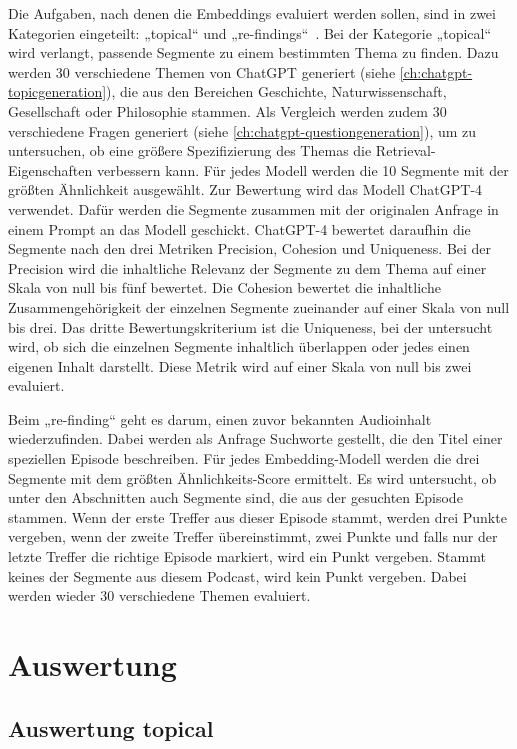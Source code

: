 Die Aufgaben, nach denen die Embeddings evaluiert werden sollen, sind in zwei Kategorien eingeteilt: „topical“ und „re-findings“~\cite{jones2021}. 
Bei der Kategorie „topical“ wird verlangt, passende Segmente zu einem bestimmten Thema zu finden. Dazu werden 30 verschiedene Themen von ChatGPT generiert (siehe \autoref{ch:chatgpt-topicgeneration}), die aus den Bereichen Geschichte, Naturwissenschaft, Gesellschaft oder Philosophie stammen. Als Vergleich werden zudem 30 verschiedene Fragen generiert (siehe \autoref{ch:chatgpt-questiongeneration}), um zu untersuchen, ob eine größere Spezifizierung des Themas die Retrieval-Eigenschaften verbessern kann. 
Für jedes Modell werden die 10 Segmente mit der größten Ähnlichkeit ausgewählt. 
Zur Bewertung wird das Modell ChatGPT-4 verwendet. Dafür werden die Segmente zusammen mit der originalen Anfrage in einem Prompt an das Modell geschickt. 
ChatGPT-4 bewertet daraufhin die Segmente nach den drei Metriken Precision, Cohesion und Uniqueness.
Bei der Precision wird die inhaltliche Relevanz der Segmente zu dem Thema auf einer Skala von null bis fünf bewertet. 
Die Cohesion bewertet die inhaltliche Zusammengehörigkeit der einzelnen Segmente zueinander auf einer Skala von null bis drei. 
Das dritte Bewertungskriterium ist die Uniqueness, bei der untersucht wird, ob sich die einzelnen Segmente inhaltlich überlappen oder jedes einen eigenen Inhalt darstellt. 
Diese Metrik wird auf einer Skala von null bis zwei evaluiert.

Beim „re-finding“ geht es darum, einen zuvor bekannten Audioinhalt wiederzufinden. 
Dabei werden als Anfrage Suchworte gestellt, die den Titel einer speziellen Episode beschreiben.
Für jedes Embedding-Modell werden die drei Segmente mit dem größten Ähnlichkeits-Score ermittelt. 
Es wird untersucht, ob unter den Abschnitten auch Segmente sind, die aus der gesuchten Episode stammen. 
Wenn der erste Treffer aus dieser Episode stammt, werden drei Punkte vergeben, wenn der zweite Treffer übereinstimmt, zwei Punkte und falls nur der letzte Treffer die richtige Episode markiert, wird ein Punkt vergeben. 
Stammt keines der Segmente aus diesem Podcast, wird kein Punkt vergeben. 
Dabei werden wieder 30 verschiedene Themen evaluiert.


\section{Auswertung}

\subsection{Auswertung topical}

